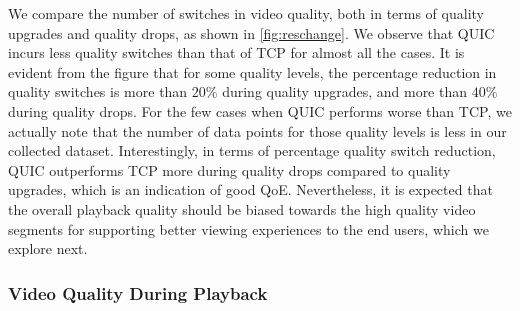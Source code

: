 We compare the number of switches in video quality, both in terms of quality upgrades and quality drops, as shown in \fig\ref{fig:reschange}.
We observe that \ac{QUIC} incurs less quality switches than that of \ac{TCP} for almost all the cases. 
It is evident from the figure that for some quality levels, the percentage reduction in quality switches is more than $20\%$ during quality upgrades, and more than $40\%$ during quality drops. For the few cases when \ac{QUIC} performs worse than \ac{TCP}, we actually note that the number of data points for those quality levels is less in our collected dataset. Interestingly, in terms of percentage quality switch reduction, \ac{QUIC} outperforms \ac{TCP}  more during quality drops compared to quality upgrades, which is an indication of good \ac{QoE}.  Nevertheless, it is expected that the overall playback quality should be biased towards the high quality video segments for supporting better viewing experiences to the end users, which we explore next. 

\subsubsection{Video Quality During Playback}

